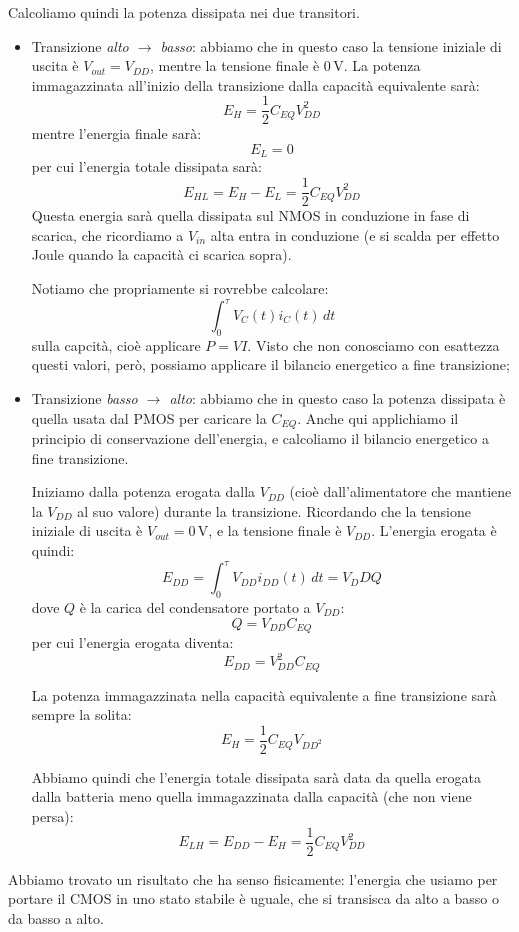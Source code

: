 \documentclass[a4paper,11pt]{article}
\begin{document}
Calcoliamo quindi la potenza dissipata nei due transitori.
\begin{itemize}
\item Transizione \textit{alto $\rightarrow$ basso}: abbiamo che in questo caso la tensione iniziale di uscita è $V_{out} = V_{DD}$, mentre la tensione finale è $0 \, \mathrm{V}$. La potenza immagazzinata all'inizio della transizione dalla capacità equivalente sarà:
$$
E_H = \frac{1}{2} C_{EQ} V_{DD}^2 
$$
mentre l'energia finale sarà:
$$
E_L = 0
$$
per cui l'energia totale dissipata sarà:
$$
E_{HL} = E_H - E_L = \frac{1}{2} C_{EQ} V_{DD}^2
$$
Questa energia sarà quella dissipata sul NMOS in conduzione in fase di scarica, che ricordiamo a $V_{in}$ alta entra in conduzione (e si scalda per effetto Joule quando la capacità ci scarica sopra).

Notiamo che propriamente si rovrebbe calcolare:
$$
\int_0^\tau V_C(t) i_C(t) \, dt
$$
sulla capcità, cioè applicare $P = VI$. Visto che non conosciamo con esattezza questi valori, però, possiamo applicare il bilancio energetico a fine transizione;

\item Transizione \textit{basso $\rightarrow$ alto}: abbiamo che in questo caso la potenza dissipata è quella usata dal PMOS per caricare la $C_{EQ}$. Anche qui applichiamo il principio di conservazione dell'energia, e calcoliamo il bilancio energetico a fine transizione.

	Iniziamo dalla potenza erogata dalla $V_{DD}$ (cioè dall'alimentatore che mantiene la $V_{DD}$ al suo valore) durante la transizione. Ricordando che la tensione iniziale di uscita è $V_{out} = 0 \, \mathrm{V}$, e la tensione finale è $V_{DD}$. L'energia erogata è quindi:
$$
E_{DD} = \int_0^\tau V_{DD} i_{DD}(t) \, dt = V_DD Q
$$
dove $Q$ è la carica del condensatore portato a $V_{DD}$:
$$
Q = V_{DD} C_{EQ}
$$
per cui l'energia erogata diventa:
$$
E_{DD} = V_{DD}^2 C_{EQ}
$$

La potenza immagazzinata nella capacità equivalente a fine transizione sarà sempre la solita:
$$
E_{H} = \frac{1}{2} C_{EQ} V_{DD^2}
$$

Abbiamo quindi che l'energia totale dissipata sarà data da quella erogata dalla batteria meno quella immagazzinata dalla capacità (che non viene persa):
$$
E_{LH} = E_{DD} - E_H = \frac{1}{2} C_{EQ} V_{DD}^2
$$

\end{itemize}

Abbiamo trovato un risultato che ha senso fisicamente: l'energia che usiamo per portare il CMOS in uno stato stabile è uguale, che si transisca da alto a basso o da basso a alto.
\end{document}
